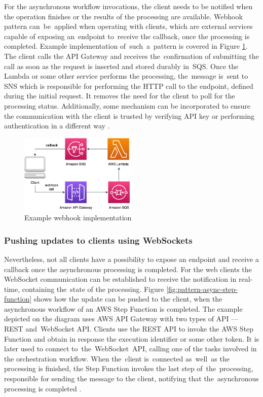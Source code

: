 For the asynchronous workflow invocations, the client needs to be notified when the operation finishes or the results of the processing are available.
Webhook pattern can~be~applied when operating with clients, which are external services capable of exposing an~endpoint to~receive the callback, once the processing is completed.
Example implementation of~such~a~pattern is covered in Figure \ref{fig:pattern-webhook}.
The client calls the API Gateway and receives the~confirmation of submitting the call as soon as the request is inserted and stored durably in~SQS.
Once the Lambda or some other service performs the processing, the~message is~sent to SNS which is responsible for performing the HTTP call to the endpoint, defined during the initial request.
It removes the need for the client to poll for the processing status.
Additionally, some mechanism can be incorporated to ensure the communication with the client is trusted by verifying API key or performing authentication in a different way \cite{ServerlessAtScaleDesignPatternsAndOptimizations}.

\begin{figure}[H]
   \centering
   \includegraphics[width=0.5\textwidth]{assets/04-serverless-for-web-apps/webhook.png}
   \caption{Example webhook implementation}
   \label{fig:pattern-webhook}
\end{figure}

\subsubsection{Pushing updates to clients using WebSockets} \label{chapter:client-websockets}

Nevertheless, not all clients have a possibility to expose an endpoint and receive a callback once the asynchronous processing is completed.
For the web clients the WebSocket communication can be established to receive the notification in real-time, containing the~state of the processing.
Figure \ref{fig:pattern-async-step-function} shows how the update can be pushed to the client, when the asynchronous workflow of an AWS Step Function is completed.
The example depicted on the diagram uses AWS API Gateway with two types of API --- REST and~WebSocket API.
Clients use the REST API to invoke the AWS Step Function and obtain in response the execution identifier or some other token.
It is later used to connect to~the~WebSocket~API, calling one of the tasks involved in the orchestration workflow.
When the~client is~connected as~well~as the processing is finished, the Step Function invokes the last step of~the~processing, responsible for sending the message to the client, notifying that the~asynchronous processing is completed \cite{ServerlessAtScaleDesignPatternsAndOptimizations}.


